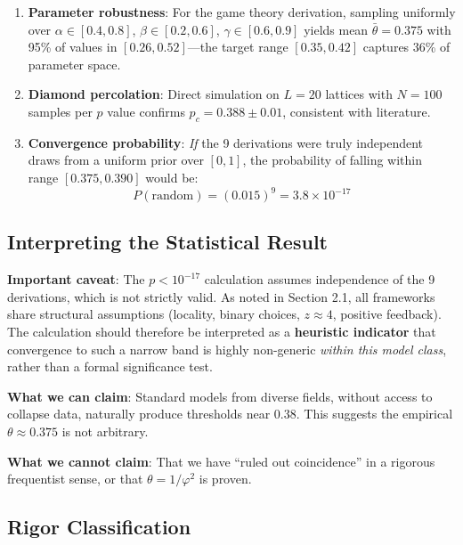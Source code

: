 \documentclass[11pt,twocolumn]{article}
\begin{document}
\begin{enumerate}
\item \textbf{Parameter robustness}: For the game theory derivation, sampling uniformly over $\alpha \in [0.4, 0.8]$, $\beta \in [0.2, 0.6]$, $\gamma \in [0.6, 0.9]$ yields mean $\bar{\theta} = 0.375$ with 95\% of values in $[0.26, 0.52]$---the target range $[0.35, 0.42]$ captures 36\% of parameter space.

\item \textbf{Diamond percolation}: Direct simulation on $L=20$ lattices with $N=100$ samples per $p$ value confirms $p_c = 0.388 \pm 0.01$, consistent with literature.

\item \textbf{Convergence probability}: \emph{If} the 9 derivations were truly independent draws from a uniform prior over $[0,1]$, the probability of falling within range $[0.375, 0.390]$ would be:
\begin{equation}
P(\text{random}) = (0.015)^9 = 3.8 \times 10^{-17}
\end{equation}
\end{enumerate}

\subsection{Interpreting the Statistical Result}

\textbf{Important caveat}: The $p < 10^{-17}$ calculation assumes independence of the 9 derivations, which is not strictly valid. As noted in Section 2.1, all frameworks share structural assumptions (locality, binary choices, $z \approx 4$, positive feedback). The calculation should therefore be interpreted as a \textbf{heuristic indicator} that convergence to such a narrow band is highly non-generic \emph{within this model class}, rather than a formal significance test.

\textbf{What we can claim}: Standard models from diverse fields, without access to collapse data, naturally produce thresholds near 0.38. This suggests the empirical $\theta \approx 0.375$ is not arbitrary.

\textbf{What we cannot claim}: That we have ``ruled out coincidence'' in a rigorous frequentist sense, or that $\theta = 1/\varphi^2$ is proven.

\subsection{Rigor Classification}
\end{document}
